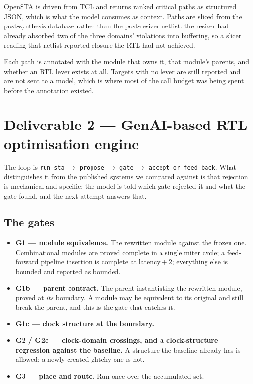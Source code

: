 \documentclass[11pt,a4paper]{article}
\begin{document}
OpenSTA is driven from TCL and returns ranked critical paths as structured
JSON, which is what the model consumes as context. Paths are sliced from the
post-synthesis database rather than the post-resizer netlist: the resizer had
already absorbed two of the three domains' violations into buffering, so a
slicer reading that netlist reported closure the RTL had not achieved.

Each path is annotated with the module that owns it, that module's parents, and
whether an RTL lever exists at all. Targets with no lever are still reported and
are not sent to a model, which is where most of the call budget was being spent
before the annotation existed.

\section{Deliverable 2 --- GenAI-based RTL optimisation engine}
\label{sec:d2}

The loop is \texttt{run\_sta} $\rightarrow$ \texttt{propose} $\rightarrow$
\texttt{gate} $\rightarrow$ \texttt{accept or feed back}. What distinguishes it
from the published systems we compared against is that rejection is
mechanical and specific: the model is told which gate rejected it and what the
gate found, and the next attempt answers that.

\subsection{The gates}
\label{sec:gates}

\begin{itemize}
  \item \textbf{G1 --- module equivalence.} The rewritten module against the
        frozen one. Combinational modules are proved complete in a single
        miter cycle; a feed-forward pipeline insertion is complete at
        latency${}+2$; everything else is bounded and reported as bounded.
  \item \textbf{G1b --- parent contract.} The parent instantiating the rewritten
        module, proved at \emph{its} boundary. A module may be equivalent to its
        original and still break the parent, and this is the gate that catches
        it.
  \item \textbf{G1c --- clock structure at the boundary.}
  \item \textbf{G2 / G2c --- clock-domain crossings, and a clock-structure
        regression against the baseline.} A structure the baseline already
        has is allowed; a newly created glitchy one is not.
  \item \textbf{G3 --- place and route.} Run once over the accumulated set.
\end{itemize}
\end{document}
